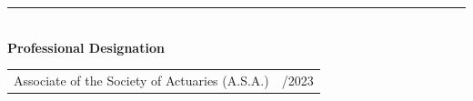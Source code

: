 \rule[4pt]{17cm}{0.3pt}\\
\medskip
{\large \bf Professional Designation}
\medskip

\begin{table}[H]
    \begin{center}
    \renewcommand{\arraystretch}{1.5}%
    \begin{tabular}{>{\raggedright}m{13cm}>{\raggedleft\arraybackslash} m{3.5cm}}
        Associate of the Society of Actuaries (A.S.A.) & 08/2023
    \end{tabular}
    \end{center}
    \end{table}
